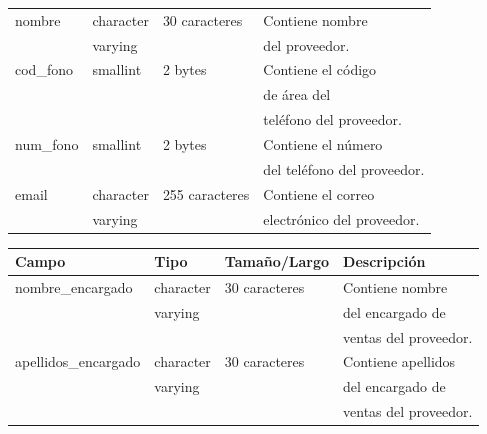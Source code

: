 \documentclass[letterpaper,12pt]{article}
\begin{document}
\begin{enumerate}
\begin{table}[!ht]
\begin{center}
\begin{tabular}{|l|l|l|l|}
nombre & character & 30 caracteres&Contiene nombre\\
\mbox{} & varying & &del proveedor.\\
\hline
cod\_fono & smallint & 2 bytes & Contiene el código\\
\mbox{} & \mbox{} & & de área del\\
\mbox{} & \mbox{} & & teléfono del proveedor.\\
\hline
num\_fono & smallint & 2 bytes & Contiene el número\\
\mbox{} & \mbox{} & & del teléfono del proveedor.\\
\hline
email & character & 255 caracteres& Contiene el correo\\
\mbox{} & varying & & electrónico del proveedor.\\
\hline
\end{tabular}
\end{center}
\end{table}

\newpage

\begin{table}[!ht]
\begin{center}
\begin{tabular}{|l|l|l|l|}
\hline
\textbf{Campo} \hspace*{2cm} & \textbf{Tipo} & \textbf{Tamaño/Largo} & \textbf{Descripción} \hspace*{3,5cm} \\
\hline

nombre\_encargado & character & 30 caracteres&Contiene nombre\\
\mbox{} & varying & &del encargado de\\
\mbox{} & \mbox{} & &ventas del proveedor.\\
\hline
apellidos\_encargado & character & 30 caracteres&Contiene apellidos\\
\mbox{} & varying & &del encargado de\\
\mbox{} & \mbox{} & &ventas del proveedor.\\
\hline


\end{tabular}
\end{center}
\end{table}

\newpage


\end{enumerate}
\end{document}
